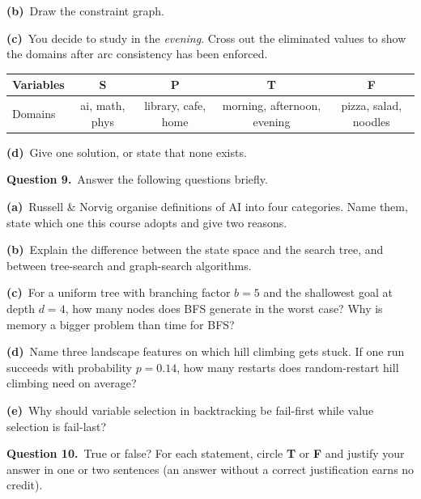 \documentclass[11pt,a4paper]{article}
\newcommand{\question}[1]{\par\medskip\noindent\textbf{Question #1.}\ }
\newcommand{\subq}[1]{\par\smallskip\noindent\textbf{#1}\ }
\begin{document}
\subq{(b)}Draw the constraint graph.
\begin{ansbox}[height=2.6cm]\end{ansbox}
\subq{(c)}You decide to study in the \emph{evening}. Cross out the eliminated values to show the domains after arc consistency has been enforced.
\begin{center}\small\begin{tabular}{|l|c|c|c|c|}\hline Variables & \textbf{S} & \textbf{P} & \textbf{T} & \textbf{F}\\ \hline Domains & ai, math, phys & library, cafe, home & morning, afternoon, evening & pizza, salad, noodles\\ \hline\end{tabular}\end{center}
\subq{(d)}Give one solution, or state that none exists.
\begin{ansbox}[height=0.8cm]\end{ansbox}
\clearpage
\question{9}Answer the following questions briefly.
\subq{(a)}Russell \& Norvig organise definitions of AI into four categories. Name them, state which one this course adopts and give two reasons.
\begin{ansbox}[height=2.6cm]\end{ansbox}
\subq{(b)}Explain the difference between the state space and the search tree, and between tree-search and graph-search algorithms.
\begin{ansbox}[height=2.6cm]\end{ansbox}
\subq{(c)}For a uniform tree with branching factor $b=5$ and the shallowest goal at depth $d=4$, how many nodes does BFS generate in the worst case? Why is memory a bigger problem than time for BFS?
\begin{ansbox}[height=1.8cm]\end{ansbox}
\subq{(d)}Name three landscape features on which hill climbing gets stuck. If one run succeeds with probability $p=0.14$, how many restarts does random-restart hill climbing need on average?
\begin{ansbox}[height=1.5cm]\end{ansbox}
\subq{(e)}Why should variable selection in backtracking be fail-first while value selection is fail-last?
\begin{ansbox}[height=1.8cm]\end{ansbox}
\question{10}True or false?
For each statement, circle \textbf{T} or \textbf{F} and justify your answer in one or two sentences (an answer without a correct justification earns no credit).
\end{document}
